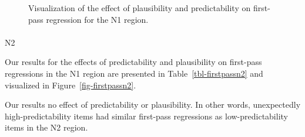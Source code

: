 \documentclass[
  12pt,
  letterpaper,
]{scrreprt}
\makeatletter
\let\oldparagraph\paragraph
\renewcommand{\paragraph}{
    \@ifstar
      \xxxParagraphStar
      \xxxParagraphNoStar
  }
\newcommand{\xxxParagraphStar}[1]{\oldparagraph*{#1}\mbox{}}
\newcommand{\xxxParagraphNoStar}[1]{\oldparagraph{#1}\mbox{}}
\makeatother
\begin{document}
\begin{figure}[htbp]

\caption{\label{fig-firstpassn1}Visualization of the effect of
plausibility and predictability on first-pass regression for the N1
region.}


\end{figure}%

\paragraph{N2}\label{n2-7}

Our results for the effects of predictability and plausibility on
first-pass regressions in the N1 region are presented in
Table~\ref{tbl-firstpassn2} and visualized in
Figure~\ref{fig-firstpassn2}.

Our results no effect of predictability or plausibility. In other words,
unexpectedly high-predictability items had similar first-pass
regressions as low-predictability items in the N2 region.
\end{document}
